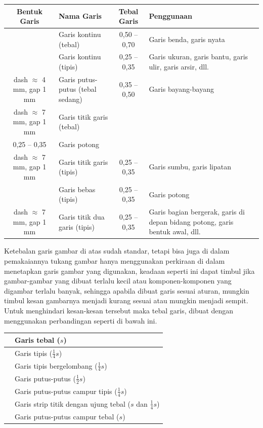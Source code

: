 \documentclass[11pt]{simart} %
\begin{document}
\begin{tabularx}{\textwidth}{|c|X|c|X|}
	\hline
	\textbf{Bentuk Garis}          &  \textbf{Nama Garis}               &  \textbf{Tebal Garis}  &  \textbf{Penggunaan}  \\
	\hline
	                               &  Garis kontinu (tebal)             &  0,50 -- 0,70          &  Garis benda, garis nyata  \\
	\hline
	                               &  Garis kontinu (tipis)             &  0,25 -- 0,35          &  Garis ukuran, garis bantu, garis ulir, garis arsir, dll.  \\
	\hline
	dash $\approx$ 4 mm, gap 1 mm  &  Garis putus-putus (tebal sedang)  &  0,35 -- 0,50          &  Garis bayang-bayang  \\
	\hline
	dash $\approx$ 7 mm, gap 1 mm  &  Garis titik garis (tebal)         &
	\begin{tabular}[c]{@{}c@{}}0,50 -- 0,70\\0,25 -- 0,35\end{tabular}
	                               &  Garis potong  \\
	\hline
	dash $\approx$ 7 mm, gap 1 mm  &  Garis titik garis (tipis)         &  0,25 -- 0,35          &  Garis sumbu, garis lipatan  \\
	\hline
	                               &  Garis bebas (tipis)               &  0,25 -- 0,35          &  Garis potong  \\
	\hline

	dash $\approx$ 7 mm, gap 1 mm  &  Garis titik dua garis (tipis)     &  0,25 -- 0,35          &  Garis bagian bergerak, garis di depan bidang potong, garis bentuk awal, dll.  \\
	\hline
\end{tabularx}

Ketebalan garis gambar di atas sudah standar, tetapi bisa juga di dalam pemakaiannya tukang gambar hanya menggunakan perkiraan di dalam menetapkan garis gambar yang digunakan, keadaan seperti ini dapat timbul jika gambar-gambar  yang  dibuat  terlalu  kecil  atau  komponen-komponen  yang digambar terlalu banyak, sehingga apabila dibuat garis sesuai aturan, mungkin timbul kesan gambarnya menjadi kurang sesuai atau mungkin menjadi sempit. Untuk menghindari kesan-kesan tersebut maka tebal garis, dibuat dengan menggunakan perbandingan seperti di bawah ini.

\begin{tabularx}{0.6\textwidth}{|c|X|}
	\hline
	  &  Garis tebal ($s$)  \\
	\hline
	  &  Garis tipis ($\frac{1}{4}s$)  \\
	\hline
	  &  Garis tipis bergelombang ($\frac{1}{4}s$)  \\
	\hline
	  &  Garis putus-putus ($\frac{1}{2}s$)  \\
	\hline
	  &  Garis putus-putus campur tipis ($\frac{1}{4}s$)  \\
	\hline
	  &  Garis strip titik dengan ujung tebal ($s$ dan $\frac{1}{4}s$)  \\
	\hline
	  &  Garis putus-putus campur tebal ($s$)  \\
	\hline
\end{tabularx}
\end{document}
